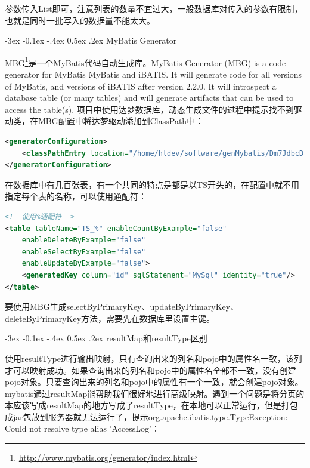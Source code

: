 \documentclass[12pt]{book}
\makeatletter
\numberwithin{dummy}{section}
\theoremstyle{ocrenumbox}
\theoremstyle{blacknumex}
\theoremstyle{blacknumbox}
\theoremstyle{ocrenum}
\renewcommand{\subsection}{\@startsection {subsection}{2}{\z@}
	{-3ex \@plus -0.1ex \@minus -.4ex}
	{0.5ex \@plus.2ex }
	{\normalfont\sffamily\bfseries}}
\makeatother
\begin{document}
参数传入List即可，注意列表的数量不宜过大，一般数据库对传入的参数有限制，也就是同时一批写入的数据量不能太大。

\subsection{MyBatis Generator}

MBG\footnote{\url{http://www.mybatis.org/generator/index.html}}是一个MyBatis代码自动生成库。MyBatis Generator (MBG) is a code generator for MyBatis MyBatis and iBATIS. It will generate code for all versions of MyBatis, and versions of iBATIS after version 2.2.0. It will introspect a database table (or many tables) and will generate artifacts that can be used to access the table(s). 项目中使用达梦数据库，动态生成文件的过程中提示找不到驱动类，在MBG配置中将达梦驱动添加到ClassPath中：

\begin{lstlisting}[language=XML]
<generatorConfiguration>
	<classPathEntry location="/home/hldev/software/genMybatis/Dm7JdbcDriver17.jar"/>
</generatorConfiguration>
\end{lstlisting}

在数据库中有几百张表，有一个共同的特点是都是以TS开头的，在配置中就不用指定每个表的名称，可以使用通配符：

\begin{lstlisting}[language=XML]
<!--使用%通配符-->
<table tableName="TS_%" enableCountByExample="false"
	enableDeleteByExample="false"
	enableSelectByExample="false"
	enableUpdateByExample="false">
	<generatedKey column="id" sqlStatement="MySql" identity="true"/>
</table>
\end{lstlisting}

要使用MBG生成selectByPrimaryKey、updateByPrimaryKey、deleteByPrimaryKey方法，需要先在数据库里设置主键。

\subsection{resultMap和resultType区别}

使用resultType进行输出映射，只有查询出来的列名和pojo中的属性名一致，该列才可以映射成功。如果查询出来的列名和pojo中的属性名全部不一致，没有创建pojo对象。只要查询出来的列名和pojo中的属性有一个一致，就会创建pojo对象。mybatis通过resultMap能帮助我们很好地进行高级映射。遇到一个问题是将分页的本应该写成resultMap的地方写成了resultType，在本地可以正常运行，但是打包成jar包放到服务器就无法运行了，提示org.apache.ibatis.type.TypeException: Could not resolve type alias 'AccessLog'：
\end{document}

